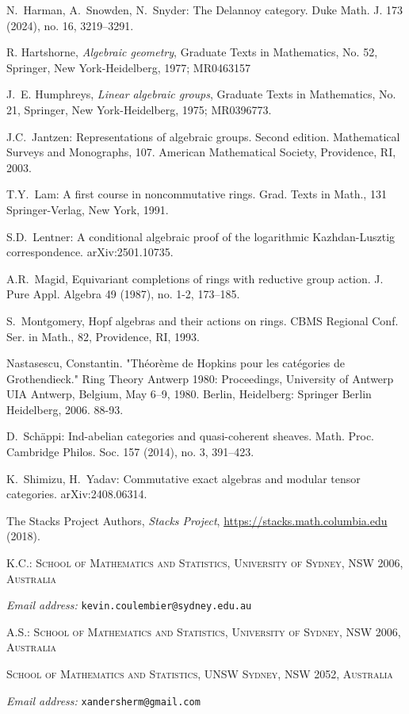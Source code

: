 \documentclass[11pt]{amsart}
\theoremstyle{definition}
\theoremstyle{remark}
\numberwithin{equation}{section}
\begin{document}
\begin{thebibliography}
 N.~Harman, A.~Snowden, N.~Snyder: The Delannoy category.
Duke Math. J. 173 (2024), no. 16, 3219--3291.

 R. Hartshorne, {\it Algebraic geometry}, Graduate Texts in Mathematics, No. 52, Springer, New York-Heidelberg, 1977; MR0463157

 J.~E. Humphreys, {\it Linear algebraic groups}, Graduate Texts in Mathematics, No. 21, Springer, New York-Heidelberg, 1975; MR0396773.

 J.C.~Jantzen:
Representations of algebraic groups. 
Second edition. Mathematical Surveys and Monographs, 107. American Mathematical Society, Providence, RI, 2003.



 T.Y.~Lam:
A first course in noncommutative rings.
Grad. Texts in Math., 131
Springer-Verlag, New York, 1991.


 S.D.~Lentner: A conditional algebraic proof of the logarithmic Kazhdan-Lusztig correspondence. arXiv:2501.10735.

 A.R.~Magid,  Equivariant completions of rings with reductive group action.
J. Pure Appl. Algebra 49 (1987), no. 1-2, 173–185.

 S.~Montgomery, Hopf algebras and their actions on rings.
CBMS Regional Conf. Ser. in Math., 82, Providence, RI, 1993.

 Nastasescu, Constantin. "Théorème de Hopkins pour les catégories de Grothendieck." Ring Theory Antwerp 1980: Proceedings, University of Antwerp UIA Antwerp, Belgium, May 6–9, 1980. Berlin, Heidelberg: Springer Berlin Heidelberg, 2006. 88-93.

 D.~Sch\"appi:
Ind-abelian categories and quasi-coherent sheaves.
Math. Proc. Cambridge Philos. Soc. 157 (2014), no. 3, 391--423.

 K.~Shimizu, H.~Yadav: Commutative exact algebras and modular tensor categories. arXiv:2408.06314.

 The Stacks Project Authors, \textit{Stacks Project}, \url{https://stacks.math.columbia.edu} (2018).

    
	\end{thebibliography}

    	
	\textsc{\footnotesize K.C.: School of Mathematics and Statistics, University of Sydney, NSW 2006, Australia} 
	
	\textit{\footnotesize Email address:} \texttt{\footnotesize kevin.coulembier@sydney.edu.au}
	
	\textsc{\footnotesize A.S.: School of Mathematics and Statistics, University of Sydney, NSW 2006, Australia} 
	
	\textsc{\footnotesize School of Mathematics and Statistics, UNSW Sydney, NSW 2052,
		Australia}
	
	\textit{\footnotesize Email address:} \texttt{\footnotesize xandersherm@gmail.com}
	
\end{document}
